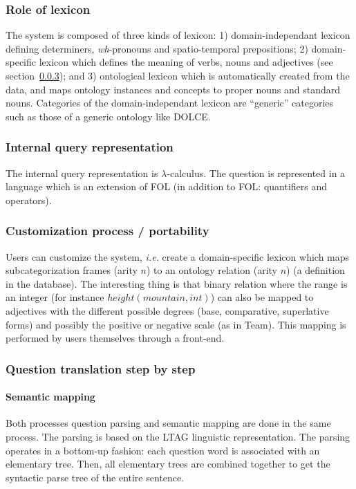 \documentclass[10pt,journal,letterpaper,compsoc]{IEEEtran}
\begin{document}
\subsubsection{Role of lexicon}
The system is composed of three kinds of lexicon: 1) domain-independant lexicon
defining determiners, {\it wh}-pronouns and spatio-temporal prepositions; 2)
domain-specific lexicon which defines the meaning of verbs, nouns and adjectives
(see section~\ref{sec:orakel-portability}); and 3) ontological lexicon which is
automatically created from the data, and maps ontology instances and concepts to
proper nouns and standard nouns.
Categories of the domain-independant lexicon are ``generic'' categories such as
those of a generic ontology like DOLCE.


\subsubsection{Internal query representation}
The internal query representation is $\lambda$-calculus.
The question is represented in a language which is an extension of FOL (in
addition to FOL: quantifiers and operators).

\subsubsection{Customization process / portability}
\label{sec:orakel-portability}
Users can customize the system, {\it i.e.} create a domain-specific lexicon
which maps subcategorization frames (arity $n$) to an ontology relation (arity
$n$) (a definition in the database).
The interesting thing is that binary relation where the range is an integer
(for instance $height(mountain,int)$) can also be mapped to adjectives with the
different possible degrees (base, comparative, superlative forms) and possibly
the positive or negative scale (as in {\sc Team}).
This mapping is performed by users themselves through a front-end.

\subsubsection{Question translation step by step}
\paragraph{Semantic mapping}
Both processes question parsing and semantic mapping are done in the same
process.
The parsing is based on the LTAG linguistic representation.
The parsing operates in a bottom-up fashion: each question word is associated
with an elementary tree. Then, all elementary trees are combined together to get
the syntactic parse tree of the entire sentence.
\end{document}

